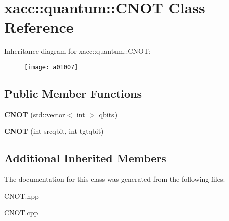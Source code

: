 \hypertarget{a01007}{}\section{xacc\+:\+:quantum\+:\+:C\+N\+OT Class Reference}
\label{a01007}
Inheritance diagram for xacc\+:\+:quantum\+:\+:C\+N\+OT\+:\begin{figure}[H]
\begin{center}
\leavevmode
\texttt{[image: a01007]}
\end{center}
\end{figure}
\subsection*{Public Member Functions}
\begin{DoxyCompactItemize}
\item 
\mbox{\label{a01007_ad3d460779a27affa317dd4f3a88268b3}} 
{\bfseries C\+N\+OT} (std\+::vector$<$ int $>$ \hyperlink{a00991_a2a56be6c2519ea65df4d06f4abae1393}{qbits})
\item 
\mbox{\label{a01007_a15efcb44477dde4b6151fe1776a73ddc}} 
{\bfseries C\+N\+OT} (int srcqbit, int tgtqbit)
\end{DoxyCompactItemize}
\subsection*{Additional Inherited Members}


The documentation for this class was generated from the following files\+:\begin{DoxyCompactItemize}
\item 
C\+N\+O\+T.\+hpp\item 
C\+N\+O\+T.\+cpp\end{DoxyCompactItemize}

